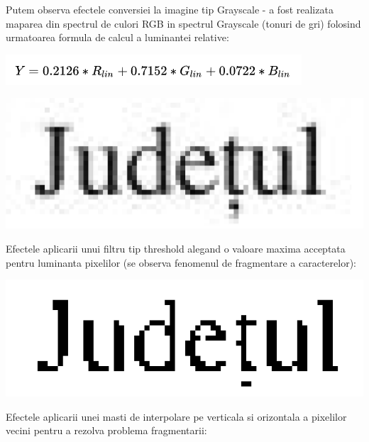 \documentclass[10pt]{article}
\begin{document}
\> Putem observa efectele conversiei la imagine tip Grayscale - a fost realizata maparea din spectrul de culori RGB in spectrul Grayscale
(tonuri de gri) folosind urmatoarea formula de calcul a luminantei relative:

\begin{center}

  \includegraphics[scale=1]{formula-luminanta}
  
\end{center}


\begin{center}

  \includegraphics[scale=0.5]{efecte-grayscale}
  
\end{center}

\newpage

\> Efectele aplicarii unui filtru tip threshold alegand o valoare maxima acceptata pentru luminanta pixelilor 
(se observa fenomenul de fragmentare a caracterelor):

\begin{center}

  \includegraphics[scale=1]{fragmentare}
  
\end{center}

\> Efectele aplicarii unei masti de interpolare pe verticala si orizontala a pixelilor vecini pentru a rezolva problema fragmentarii:
\end{document}
